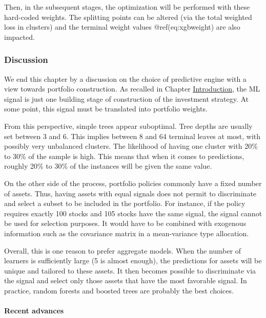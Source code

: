 Then, in the subsequent stages, the optimization will be performed with these hard-coded weights. The splitting points can be altered (via the total weighted loss in clusters) and the terminal weight values @ref(eq:xgbweight) are also impacted.

\subsubsection{Discussion}

We end this chapter by a discussion on the choice of predictive engine with a view towards portfolio construction. As recalled in Chapter \href{/chap-02-introduction}{Introduction}, the ML signal is just one building stage of construction of the investment strategy. At some point, this signal must be translated into portfolio weights.

From this perspective, simple trees appear suboptimal. Tree depths are usually set between 3 and 6. This implies between 8 and 64 terminal leaves at most, with possibly very unbalanced clusters. The likelihood of having one cluster with 20\% to 30\% of the sample is high. This means that when it comes to predictions, roughly 20\% to 30\% of the instances will be given the same value.

On the other side of the process, portfolio policies commonly have a fixed number of assets. Thus, having assets with equal signals does not permit to discriminate and select a subset to be included in the portfolio. For instance, if the policy requires exactly 100 stocks and 105 stocks have the same signal, the signal cannot be used for selection purposes. It would have to be combined with exogenous information such as the covariance matrix in a mean-variance type allocation.

Overall, this is one reason to prefer aggregate models. When the number of learners is sufficiently large (5 is almost enough), the predictions for assets will be unique and tailored to these assets. It then becomes possible to discriminate via the signal and select only those assets that have the most favorable signal. In practice, random forests and boosted trees are probably the best choices.

\paragraph{Recent advances}

